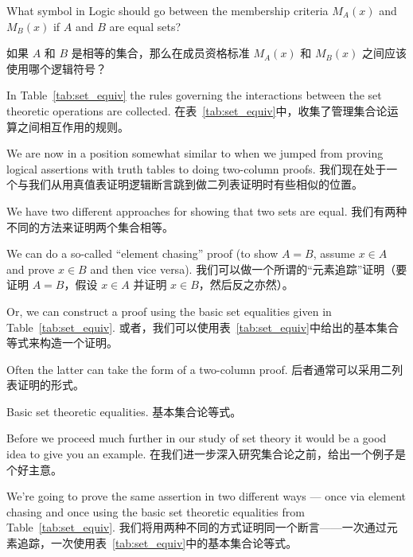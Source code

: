 \begin{exer}
What symbol in Logic should go between the membership criteria
$M_A(x)$ and $M_B(x)$ if $A$ and $B$ are equal sets?

如果 $A$ 和 $B$ 是相等的集合，那么在成员资格标准 $M_A(x)$ 和 $M_B(x)$ 之间应该使用哪个逻辑符号？
\end{exer}

In Table~\ref{tab:set_equiv} the rules governing the interactions 
between the set theoretic operations are collected.
在表~\ref{tab:set_equiv}中，收集了管理集合论运算之间相互作用的规则。

We are now in a position somewhat similar to when we jumped from
proving logical assertions with truth tables to doing two-column
proofs.
我们现在处于一个与我们从用真值表证明逻辑断言跳到做二列表证明时有些相似的位置。

We have two different approaches for showing that two
sets are equal.
我们有两种不同的方法来证明两个集合相等。

We can do a so-called ``element chasing'' proof
(to show $A=B$, assume $x \in A$ and prove $x \in B$ and then vice versa).
我们可以做一个所谓的“元素追踪”证明（要证明 $A=B$，假设 $x \in A$ 并证明 $x \in B$，然后反之亦然）。

Or, we can construct a proof using the basic set equalities given
in Table~\ref{tab:set_equiv}.
或者，我们可以使用表~\ref{tab:set_equiv}中给出的基本集合等式来构造一个证明。

Often the latter can take the form
of a two-column proof.
后者通常可以采用二列表证明的形式。
\begin{table}[h] 
\begin{center}

\end{center}
\caption{Basic set theoretic equalities. 基本集合论等式。}
\label{tab:set_equiv}
\end{table}

\clearpage

Before we proceed much further in our study of set theory it would be a
good idea to give you an example.
在我们进一步深入研究集合论之前，给出一个例子是个好主意。

We're going to prove the same assertion
in two different ways --- once via element chasing and once using the 
basic set theoretic equalities from Table~\ref{tab:set_equiv}.
我们将用两种不同的方式证明同一个断言——一次通过元素追踪，一次使用表~\ref{tab:set_equiv}中的基本集合论等式。

